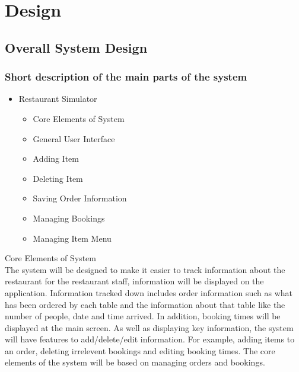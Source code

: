 \chapter{Design}

\section{Overall System Design}

\subsection{Short description of the main parts of the system}

\begin{itemize}
	\item Restaurant Simulator
	\begin{itemize}
		\item Core Elements of System
		\item General User Interface
		\item Adding Item
		\item Deleting Item
		\item Saving Order Information
		\item Managing Bookings
		\item Managing Item Menu

	\end{itemize}
		
\end{itemize}

Core Elements of System
\\
The system will be designed to make it easier to track information about the restaurant for the restaurant staff, information will be displayed on the application. Information tracked down includes order information such as what has been ordered by each table and the information about that table like the number of people, date  and time arrived. In addition, booking times will be displayed at the main screen. As well as displaying key information, the system will have features to add/delete/edit information. For example, adding items to an order, deleting irrelevent bookings and editing booking times. The core elements of the system will be based on managing orders and bookings.

